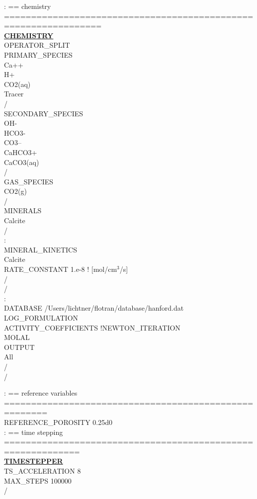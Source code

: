 \documentclass[12pt]{article}
\begin{document}
\noindent
: == chemistry ================================================================\\
\hyperlink{target_chem}{\bf CHEMISTRY}\\
OPERATOR\_SPLIT\\
PRIMARY\_SPECIES\\
Ca++\\
H+\\
CO2(aq)\\
Tracer\\
/\\
SECONDARY\_SPECIES\\
OH-\\
HCO3-\\
CO3--\\
CaHCO3+\\
CaCO3(aq)\\
/\\
GAS\_SPECIES\\
CO2(g)\\
/\\
MINERALS\\
Calcite\\
/\\
:\\
MINERAL\_KINETICS\\
Calcite\\
RATE\_CONSTANT 1.e-8 ! [mol/cm$^3$/s]\\
/\\
/\\
:\\
DATABASE /Users/lichtner/flotran/database/hanford.dat\\
LOG\_FORMULATION\\
ACTIVITY\_COEFFICIENTS !NEWTON\_ITERATION\\
MOLAL\\
OUTPUT\\
All\\
/\\
/

\noindent
: == reference variables ======================================================\\
REFERENCE\_POROSITY 0.25d0\\

\noindent
: == time stepping ============================================================\\
\hyperlink{target_timestep}{\bf TIMESTEPPER}\\
TS\_ACCELERATION 8\\
MAX\_STEPS 100000\\
/
\end{document}
